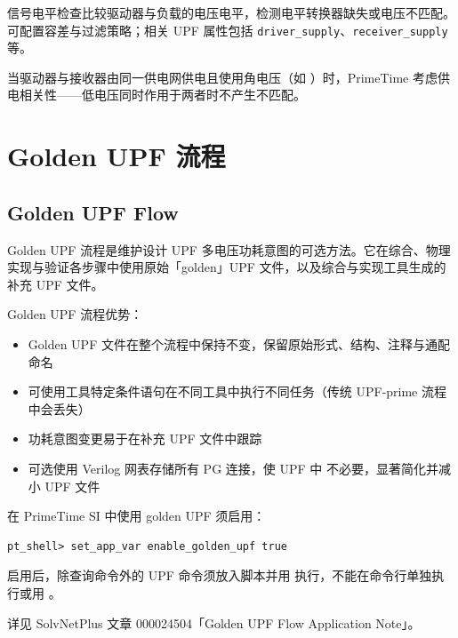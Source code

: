 信号电平检查比较驱动器与负载的电压电平，检测电平转换器缺失或电压不匹配。可配置容差与过滤策略；相关 UPF 属性包括 \texttt{driver\_supply}、\texttt{receiver\_supply} 等。

当驱动器与接收器由同一供电网供电且使用角电压（如 ）时，PrimeTime 考虑供电相关性——低电压同时作用于两者时不产生不匹配。



\section{Golden UPF 流程}
\subsection*{Golden UPF Flow}

Golden UPF 流程是维护设计 UPF 多电压功耗意图的可选方法。它在综合、物理实现与验证各步骤中使用原始「golden」UPF 文件，以及综合与实现工具生成的补充 UPF 文件。


Golden UPF 流程优势：
\begin{itemize}
  \item Golden UPF 文件在整个流程中保持不变，保留原始形式、结构、注释与通配命名
  \item 可使用工具特定条件语句在不同工具中执行不同任务（传统 UPF-prime 流程中会丢失）
  \item 功耗意图变更易于在补充 UPF 文件中跟踪
  \item 可选使用 Verilog 网表存储所有 PG 连接，使 UPF 中  不必要，显著简化并减小 UPF 文件
\end{itemize}

在 PrimeTime SI 中使用 golden UPF 须启用：
\begin{lstlisting}
pt_shell> set_app_var enable_golden_upf true
\end{lstlisting}

启用后，除查询命令外的 UPF 命令须放入脚本并用  执行，不能在命令行单独执行或用 。

\begin{seeAlsoBox}
详见 SolvNetPlus 文章 000024504「Golden UPF Flow Application Note」。
\end{seeAlsoBox}

